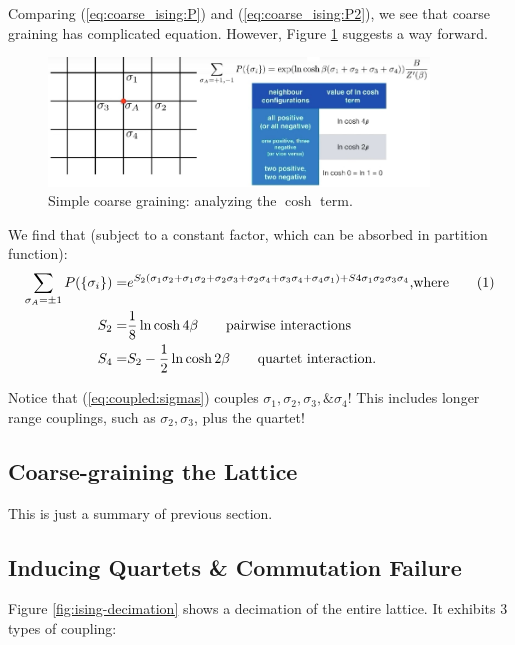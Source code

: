 \documentclass[]{article}
\newcommand\numberthis{\addtocounter{equation}{1}\tag{\theequation}}
\begin{document}
Comparing (\ref{eq:coarse_ising:P}) and (\ref{eq:coarse_ising:P2}), we see that coarse graining has complicated equation. However, Figure \ref{fig:ising-cosh} suggests a way forward.

\begin{figure}[H]
	\caption{Simple coarse graining: analyzing the $\cosh$ term.}\label{fig:ising-cosh}
	\includegraphics[width=0.9\textwidth]{ising-cosh}
\end{figure}

We find that (subject to a constant factor, which can be absorbed in partition function):
\begin{align*}
\sum_{\sigma_A=\pm 1} P(\{\sigma_i\}) =&e^{S_2 (\sigma_1\sigma_2 + \sigma_1\sigma_2+ \sigma_2\sigma_3 + \sigma_2 \sigma_4 + \sigma_3 \sigma_4 +\sigma_4 \sigma_1) + S4 \sigma_1 \sigma_2 \sigma_3 \sigma_4} \text{,where} \numberthis \label{eq:coupled:sigmas}\\
S_2 =& \frac{1}{8} \ln{\cosh{4\beta}} \tag*{pairwise interactions}\\
S_4 =& S_2 - \frac{1}{2} \ln{\cosh{2\beta}} \tag*{quartet interaction.}
\end{align*}

Notice that (\ref{eq:coupled:sigmas}) couples $\sigma_1, \sigma_2, \sigma_3, \& \sigma_4$! This includes longer range couplings, such as $\sigma_2, \sigma_3$, plus the quartet!

\subsection{Coarse-graining the Lattice}

This is just a summary of previous section.

\subsection{Inducing Quartets \& Commutation Failure}

Figure \ref{fig:ising-decimation}\cite{aoki2014domain} shows a decimation of the entire lattice. It exhibits 3 types of coupling:
\end{document}
